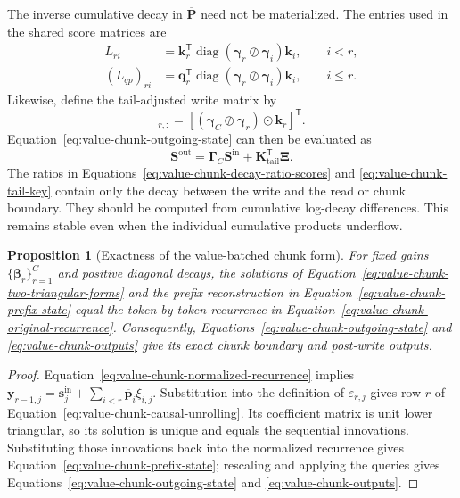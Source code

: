 \documentclass[11pt]{article}
\newcommand{\ve}[1]{\boldsymbol{#1}}
\newcommand{\tr}{\mathsf{T}}
\newcommand{\diag}{\operatorname{diag}}
\newtheorem{proposition}{Proposition}
\begin{document}
The inverse cumulative decay in $\overline{\ve{P}}$ need not be materialized.  The entries used in
the shared score matrices are
\begin{equation}
\begin{aligned}
  L_{ri}
  &=\ve{k}_r^{\tr}
    \diag(\ve{\gamma}_r\oslash\ve{\gamma}_i)\ve{k}_i,
    \qquad i<r,
  \\
  (L_{qp})_{ri}
  &=\ve{q}_r^{\tr}
    \diag(\ve{\gamma}_r\oslash\ve{\gamma}_i)\ve{k}_i,
    \qquad i\le r.
\end{aligned}
  \label{eq:value-chunk-decay-ratio-scores}
\end{equation}
Likewise, define the tail-adjusted write matrix by
\begin{equation}
  [\ve{K}_{\mathrm{tail}}]_{r,:}
  =\left[
    (\ve{\gamma}_C\oslash\ve{\gamma}_r)\odot\ve{k}_r
   \right]^{\tr}.
  \label{eq:value-chunk-tail-key}
\end{equation}
Equation~\eqref{eq:value-chunk-outgoing-state} can then be evaluated as
\begin{equation}
  \ve{S}^{\mathrm{out}}
  =\ve{\Gamma}_C\ve{S}^{\mathrm{in}}
   +\ve{K}_{\mathrm{tail}}^{\tr}\ve{\Xi}.
  \label{eq:value-chunk-stable-outgoing-state}
\end{equation}
The ratios in Equations~\eqref{eq:value-chunk-decay-ratio-scores} and
\eqref{eq:value-chunk-tail-key} contain only the decay between the write and the read or chunk
boundary.  They should be computed from cumulative log-decay differences.  This remains stable
even when the individual cumulative products underflow.

\begin{proposition}[Exactness of the value-batched chunk form]
For fixed gains $\{\ve{\beta}_r\}_{r=1}^{C}$ and positive diagonal decays, the solutions of
Equation~\eqref{eq:value-chunk-two-triangular-forms} and the prefix reconstruction in
Equation~\eqref{eq:value-chunk-prefix-state} equal the token-by-token recurrence in
Equation~\eqref{eq:value-chunk-original-recurrence}.  Consequently,
Equations~\eqref{eq:value-chunk-outgoing-state} and \eqref{eq:value-chunk-outputs} give its exact
chunk boundary and post-write outputs.
\end{proposition}

\begin{proof}
Equation~\eqref{eq:value-chunk-normalized-recurrence} implies
$\ve{y}_{r-1,j}=\ve{s}^{\mathrm{in}}_j+
\sum_{i<r}\overline{\ve{p}}_i\xi_{i,j}$.  Substitution into the definition of
$\varepsilon_{r,j}$ gives row $r$ of Equation~\eqref{eq:value-chunk-causal-unrolling}.  Its
coefficient matrix is unit lower triangular, so its solution is unique and equals the sequential
innovations.  Substituting those innovations back into the normalized recurrence gives
Equation~\eqref{eq:value-chunk-prefix-state}; rescaling and applying the queries gives
Equations~\eqref{eq:value-chunk-outgoing-state} and \eqref{eq:value-chunk-outputs}.
\end{proof}
\end{document}
